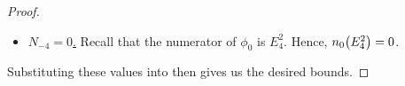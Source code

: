 \begin{proof}
\begin{itemize}
        \item \underline{$N_{-4} = 0$.} Recall that the numerator of $\phi_0$ is $E_4^2$. Hence, $n_0\!\left( E_4^2 \right) = 0$.
    \end{itemize}
    Substituting these values into  then gives us the desired bounds.
    \begin{comment}
    The following is a consequence of a result proved by Ramanujan \todo{find citation for original paper} in the theory of (quasi-)modular forms:
    \begin{align}
        E_2 E_4 - E_6 &= 720 \sum_{n=1}^{\infty} n \, \sigma_3(n) \, e^{2\pi i nz}
        \label{Ch4:Eq:E2E4_sub_E6_qexpansion}
    \end{align}
    with the sum converging absolutely. Furthermore, it is easily seen that $\sigma_3(n) = \BigO{n^4}$, since $\sigma_3(n)$ is the sum of at most $n$ elements that are each at most $n^3$. Then, combining \eqref{Ch4:Eq:E2E4_sub_E6_qexpansion} and \eqref{Ch2:Eq:E4_qexpansion}, one can show that $E_4^2$, $E_4\parenth{E_2 E_4 - E_6}$, and $\parenth{E_2 E_4 - E_6}$ all have Fourier expansions in which each Fourier coefficient is $\BigO{n^{10}}$. For instance, we know
    \begin{align}
        \parenth{E_2 E_4 - E_6}^2 = 720^2 \sum_{m=1}^{\infty} \sum_{n=1}^{\infty} n \, \sigma_3(n) \, e^{2\pi i z \parenth{m + n}}
        \label{Ch4:Eq:E2E4_sub_E6_sq_qexpansion}
    \end{align}
    The Fourier coefficient corresponding to a term of the form $e^{2 \pi i z \parenth{m + n}}$ is a sum of at most $m + n$ terms that are each bounded above by $\parenth{\parenth{m + n}\sigma_3\of{m + n}}^2$, which is $\BigO{\parenth{m + n}^{10}}$. Similar computations can be performed for $E_4^2$ and $E_4\parenth{E_2 E_4 - E_6}$, proving that the polynomial growth assumption of \Cref{SP:PolyFourierCoeffBound} is satisfied by $\phi_{-4}$, $\phi_{-2}$ and $\phi_0$.

    We also note from \eqref{Ch4:Eq:E2E4_sub_E6_sq_qexpansion} that the smallest nonzero Fourier coefficient corresponds to $m + n = 2$. Reconciling this with the fact that in the statement of \Cref{SP:PolyFourierCoeffBound}, we express the Fourier series in terms of powers of $e^{\pi i z}$ and not $e^{2 \pi i z}$, we conclude that the right choice of $n_0$ to bound $\phi_0$ is $4$. Similar computations show that the right value for $\phi_{-2}$ is $2$ and that for $\phi_{-4}$ is $0$, which allows us to apply \Cref{SP:PolyFourierCoeffBound} and conclude that there exist $C_0, C_{-2}, C_{-4} > 0$ such that
    \begin{align*}
        \abs{\phi_0\of{z}} &\leq C_{0} e^{-2\pi\Im(z)} \\
        \abs{\phi_{-2}\of{z}} &\leq C_{-2} \\
        \abs{\phi_{-4}\of{z}} &\leq C_{-4} e^{2\pi\Im(z)}
    \end{align*}
    as required.
    \end{comment}
\end{proof}

